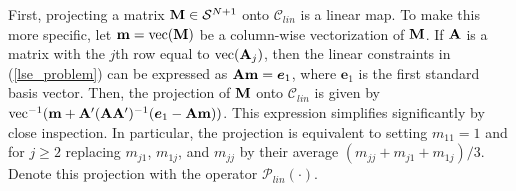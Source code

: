 \documentclass[11pt]{article}
\newcommand{\R}{\mathbb{R}}
\theoremstyle{definition}
\theoremstyle{definition}
\def\s{{\bf s}}
\def\m{{\bf m}}
\def\A{{\bf A}}
\def\M{{\bf M}}
\def\vec{\text{vec}}
\begin{document}
%
%







First, projecting a matrix $\M \in \mathcal{S}^{N+1}$  onto $\mathcal{C}_{lin}$ is a linear map. To make this more specific, let $\m = \vec(\M)$ be a column-wise vectorization of $\M$. 
If $\A$ is a matrix with the $j$th row equal to $\vec(\A_j)$, then the  linear constraints in (\ref{lse_problem}) can be expressed as $\A\m =  \boldsymbol{e}_1$, where $\boldsymbol{e}_1$ is the first standard basis vector. Then, the projection of  $\M$ onto $\mathcal{C}_{lin}$ is given by $\vec^{-1}(\m + \A' (\A \A')^{-1}(\boldsymbol{e}_1 - \A\m))$. This expression simplifies significantly by close inspection. In particular, the projection is equivalent to setting $m_{11} = 1$ and for $j \geq 2$ replacing $m_{j1}$, $m_{1j}$, and $m_{jj}$ by their average $(m_{jj} + m_{j1} + m_{1j})/3$. Denote this projection with the operator $\mathcal{P}_{lin}(\cdot)$. 
\end{document}
